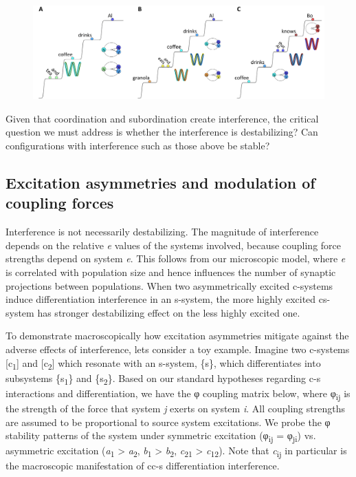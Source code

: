   
\begin{figure}
\includegraphics[width=\textwidth]{figures/Tilsen-img94.png}
\caption{\missingcaption}
\label{fig:}
\end{figure}
 

  Given that coordination and subordination create interference, the critical question we must address is whether the interference is destabilizing? Can configurations with interference such as those above be stable? 

\subsection{Excitation asymmetries and modulation of coupling forces}

Interference is not necessarily destabilizing. The magnitude of interference depends on the relative \textit{e} values of the systems involved, because coupling force strengths depend on system \textit{e}. This follows from our microscopic model, where \textit{e} is correlated with population size and hence influences the number of synaptic projections between populations. When two asymmetrically excited c-systems induce differentiation interference in an s-system, the more highly excited cs-system has stronger destabilizing effect on the less highly excited one.

  To demonstrate macroscopically how excitation asymmetries mitigate against the adverse effects of interference, lets consider a toy example. Imagine two c-systems [c\textsubscript{1}] and [c\textsubscript{2}] which resonate with an s-system, \{s\}, which differentiates into subsystems \{s\textsubscript{1}\} and \{s\textsubscript{2}\}. Based on our standard hypotheses regarding c-s interactions and differentiation, we have the φ coupling matrix below, where φ\textsubscript{ij} is the strength of the force that system \textit{j} exerts on system \textit{i}. All coupling strengths are assumed to be proportional to source system excitations. We probe the φ stability patterns of the system under symmetric excitation (φ\textsubscript{ij} = φ\textsubscript{ji}) vs. asymmetric excitation (\textit{a}\textsubscript{1} > \textit{a}\textsubscript{2}, \textit{b}\textsubscript{1} > \textit{b}\textsubscript{2}, \textit{c}\textsubscript{21} > \textit{c}\textsubscript{12}). Note that \textit{c}\textsubscript{ij} in particular is the macroscopic manifestation of cc-s differentiation interference.

